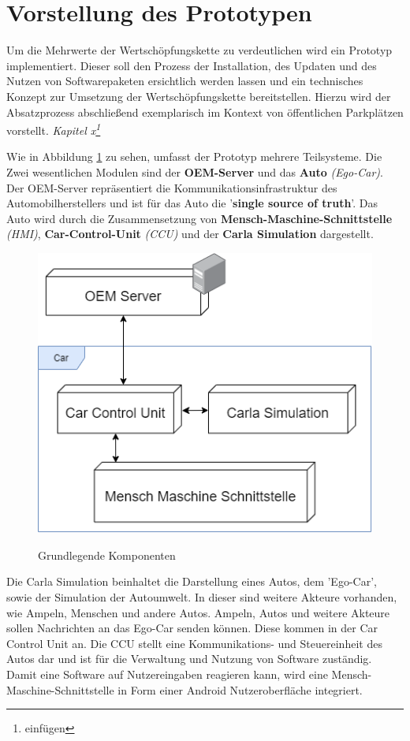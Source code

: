 \section{Vorstellung des Prototypen}
Um die Mehrwerte der Wertschöpfungskette zu verdeutlichen wird ein Prototyp implementiert. Dieser soll den Prozess der Installation, des Updaten und des Nutzen von Softwarepaketen ersichtlich werden lassen und ein technisches Konzept zur Umsetzung der Wertschöpfungskette bereitstellen. Hierzu wird der Absatzprozess abschließend exemplarisch im Kontext von öffentlichen Parkplätzen vorstellt. \textit{Kapitel x\footnote{einfügen}}

Wie in Abbildung \ref{img:basic} zu sehen, umfasst der Prototyp mehrere Teilsysteme. Die Zwei wesentlichen Modulen sind der \textbf{OEM-Server} und das \textbf{Auto} \textit{(Ego-Car)}. Der OEM-Server repräsentiert die Kommunikationsinfrastruktur des Automobilherstellers und ist für das Auto die '\textbf{single source of truth}'. Das Auto wird durch die Zusammensetzung von \textbf{Mensch-Maschine-Schnittstelle} \textit{(HMI)}, \textbf{Car-Control-Unit} \textit{(CCU)} und der \textbf{Carla Simulation} dargestellt.
\begin{figure}[!h]
	\centering
	\includegraphics[width=0.5\columnwidth]{pictures/basic.png}
	\label{img:basic}
	\caption{Grundlegende Komponenten}
\end{figure}
Die Carla Simulation beinhaltet die Darstellung eines Autos, dem 'Ego-Car', sowie der Simulation der Autoumwelt. In dieser sind weitere Akteure vorhanden, wie Ampeln, Menschen und andere Autos. Ampeln, Autos und weitere Akteure sollen Nachrichten an das Ego-Car senden können. Diese kommen in der Car Control Unit an. Die CCU stellt eine Kommunikations- und Steuereinheit des Autos dar und ist für die Verwaltung und Nutzung von Software zuständig. Damit eine Software auf Nutzereingaben reagieren kann, wird eine Mensch-Maschine-Schnittstelle in Form einer Android Nutzeroberfläche integriert.\\

